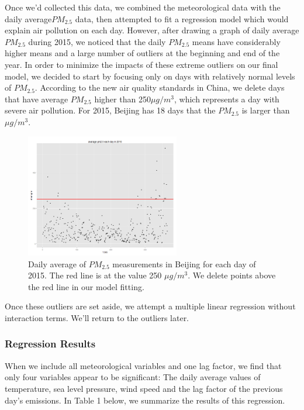 \documentclass[11pt]{article} %
\begin{document}
Once we'd collected this data, we combined the meteorological data with the daily average\(PM_{2.5}\) data, then attempted to fit a regression model which would explain air pollution on each day. However, after drawing a graph of daily average \(PM_{2.5}\) during 2015, we noticed that the daily \(PM_{2.5}\) means have considerably higher means and a large number of outliers at the beginning and end of the year. In order to minimize the impacts of these extreme outliers on our final model, we decided to start by focusing only on days with relatively normal levels of \(PM_{2.5}\). According to the new air quality standards in China, we delete days that have average \(PM_{2.5}\) higher than 250\(\mu g/m^3\), which represents a day with severe air pollution. For 2015, Beijing has 18 days that the \(PM_{2.5}\) is larger than \(\mu g/m^3\).

 \begin{figure}[!ht]
  \centering
    \includegraphics[width=0.6\textwidth]{Figure2-1}
      \caption{Daily average of \(PM_{2.5}\) measurements in Beijing for each day of 2015. The red line is at the value 250 \(\mu g / m^3\). We delete points above the red line in our model fitting.}
\end{figure}
 
 
Once these outliers are set aside, we attempt a multiple linear regression without interaction terms. We'll return to the outliers later. 

\subsubsection{Regression Results} 
When we include all meteorological variables and one lag factor, we find that only four variables appear to be significant: The daily average values of temperature, sea level pressure, wind speed and the lag factor of the previous day's emissions. In Table 1 below, we summarize the results of this regression.
 
\end{document}

